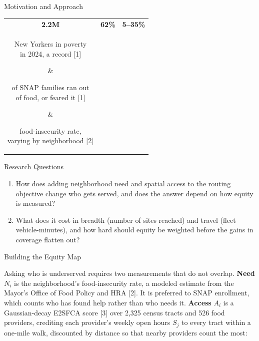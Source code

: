 \documentclass[final]{beamer}
\newlength{\colwidth}
\newcommand{\callout}[1]{{\fontsize{62}{70}\selectfont\bfseries\color{PrimaryBlue}#1}}
\newcommand{\calloutcap}[1]{\parbox[t]{0.31\linewidth}{\centering\normalsize #1}}
\begin{document}
\begin{frame}[t]
\begin{columns}[t]
\begin{column}{\colwidth}
\begin{block}{Motivation and Approach}
    \vspace{0.3em}
    \begin{center}
    \begin{tabular*}{\linewidth}{@{\extracolsep{\fill}}ccc@{}}
      \callout{2.2M} & \callout{62\%} & \callout{5--35\%} \\[0.15em]
      \calloutcap{New Yorkers in poverty\\ in 2024, a record [1]} &
      \calloutcap{of SNAP families ran out\\ of food, or feared it [1]} &
      \calloutcap{food-insecurity rate,\\ varying by neighborhood [2]} \\
    \end{tabular*}
    \end{center}

  \end{block}

\vspace{0.8em}

  \begin{alertblock}{Research Questions}

    \begin{enumerate}
      \item How does adding neighborhood need and spatial access to the routing
            objective change who gets served, and does the answer depend on how
            equity is measured?
      \item What does it cost in breadth (number of sites reached) and travel (fleet
            vehicle-minutes), and how hard should equity be weighted before the gains in coverage flatten out?
    \end{enumerate}

  \end{alertblock}

\vspace{0.8em}

  \begin{block}{Building the Equity Map}

    Asking who is underserved requires two measurements that do not overlap.
    \textbf{Need} $N_i$ is the neighborhood's food-insecurity rate, a modeled
    estimate from the Mayor's Office of Food Policy and HRA [2]. It is preferred
    to SNAP enrollment, which counts who has found help rather than who needs
    it. \textbf{Access} $A_i$ is a Gaussian-decay E2SFCA score [3] over
    2,325 census tracts and 526 food providers, crediting each provider's weekly open
    hours $S_j$ to every tract within a one-mile walk, discounted by distance so that nearby providers count the most:


\end{block}
\end{column}
\end{columns}
\end{frame}
\end{document}
